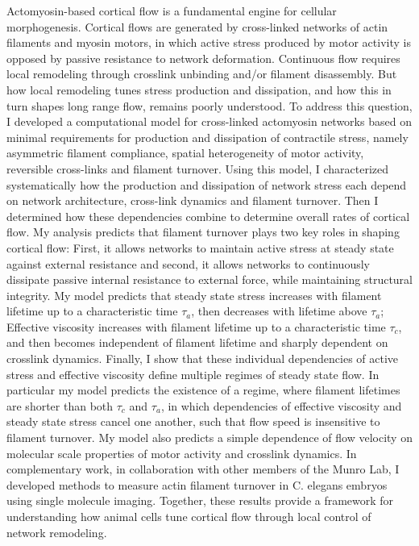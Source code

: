 \documentclass{ucetd}
\begin{document}
\abstract
Actomyosin-based cortical flow is a fundamental engine for cellular morphogenesis.  Cortical flows are generated by cross-linked networks of actin filaments and myosin motors, in which active stress produced by motor activity is opposed by passive resistance to network deformation.  Continuous flow requires local remodeling through crosslink unbinding and/or filament disassembly. But how local remodeling tunes stress production and dissipation, and how this in turn shapes long range flow, remains poorly understood. To address this question, I developed a computational model for cross-linked actomyosin networks based on minimal requirements for production and dissipation of contractile stress, namely asymmetric filament compliance, spatial heterogeneity of motor activity, reversible cross-links and filament turnover.  Using this model, I characterized systematically how the production and dissipation of network stress each depend on network architecture, cross-link dynamics and filament turnover.  Then I determined how these dependencies combine to determine overall rates of cortical flow. My analysis predicts that filament turnover plays two key roles in shaping cortical flow: First, it allows networks to maintain active stress at steady state against external resistance and second,  it allows networks to continuously dissipate passive internal resistance to external force, while maintaining structural integrity. My model predicts that steady state stress increases with filament lifetime up to a characteristic time $\tau_{a}$, then decreases with lifetime above $\tau_{a}$; Effective viscosity increases with filament lifetime up to a characteristic time $\tau_c$, and then becomes independent of filament lifetime and sharply dependent on crosslink dynamics.  Finally, I show that these individual dependencies of active stress and effective viscosity define multiple regimes of steady state flow.  In particular my model predicts the existence of a regime, where filament lifetimes are shorter than both $\tau_c$ and $\tau_{a}$, in which dependencies of effective viscosity and steady state stress cancel one another, such that flow speed is insensitive to filament turnover.  My model also predicts a simple dependence of flow velocity on molecular scale properties of motor activity and crosslink dynamics.  In complementary work, in collaboration with other members of the Munro Lab, I developed methods to measure actin filament turnover in C. elegans embryos using single molecule imaging. Together, these results provide a framework for understanding how animal cells tune cortical flow through local control of network remodeling.  
\end{document}
